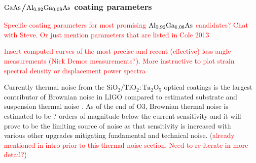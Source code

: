 \subsubsection{$\mathrm{GaAs}$/$\mathrm{Al_{0.92}Ga_{0.08}As}$ coating parameters}
\textcolor{red}{Specific coating parameters for most promising $\mathrm{Al_{0.92}Ga_{0.08}As}$ candidates? Chat with Steve. Or just mention parameters that are listed in Cole 2013}
\cite{Cole:2013}

\textcolor{red}{Insert computed curves of the most precise and recent (effective) loss angle measurements (Nick Demos measurements?). More instructive to plot strain spectral density or displacement power spectra}

\noindent Currently thermal noise from the $\mathrm{SiO_2}/\mathrm{TiO_2:Ta_2O_5}$ optical coatings is the largest contributor of Brownian noise in LIGO compared to estimated substrate and suspension thermal noise \cite{Harry:06}. As of the end of O3, Brownian thermal noise is estimated to be ? orders of magnitude below the current sensitivity and it will prove to be the limiting source of noise as that sensitivity is increased with various other upgrades mitigating fundamental and technical noise. (\textcolor{red}{already mentioned in intro prior to this thermal noise section. Need to re-iterate in more detail?})
